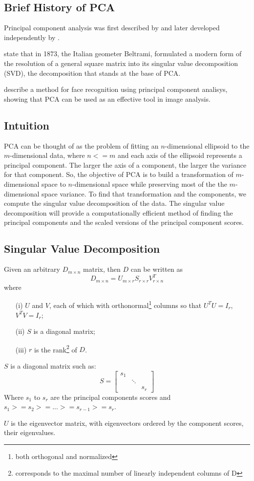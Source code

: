 \documentclass{article} %
\begin{document}
\subsection{Brief History of PCA}
Principal component analysis was first described by \citet{pearson1901principal} and later developed independently by \citet{hotelling1933analysis} \citep{jolliffe1986principal}.\par
\citet{preisendorfer1988principal} state that in 1873, the Italian geometer Beltrami, formulated a modern form of the resolution of a general square matrix into its singular value decomposition (SVD), the decomposition that stands at the base of PCA.\par
\citet{craw1992face} describe a method for face recognition using principal component analisys, showing that PCA can be used as an effective tool in image analysis.
\subsection{Intuition}
PCA can be thought of as the problem of fitting an $n$-dimensional ellipsoid to the $m$-dimensional data, where $n<=m$ and each axis of the ellipsoid represents a principal component. The larger the axis of a component, the larger the variance for that component. So, the objective of PCA is to build a transformation of $m$-dimensional space to $n$-dimensional space while preserving most of the the $m$-dimensional space variance. To find that transformation and the components, we compute the singular value decomposition of the data. The singular value decomposition will provide a computationally efficient method of finding the principal components and the scaled versions of the principal component scores.
\subsection{Singular Value Decomposition}
Given an arbitrary $D_{m\times n}$ matrix, then $D$ can be written as
\begin{equation} \label{eq:SVD}
D_{m\times n}=U_{m\times r}S_{r\times r}V_{r\times n}^T
\end{equation}
where
\begin{enumerate}
\item[(i)] $U$ and $V$, each of which with orthonormal\footnote{both orthogonal and normalized} columns so that $U^TU=I_{r}$, $V^TV=I_{r}$;
\item[(ii)] $S$ is a diagonal matrix;
\item[(iii)] $r$ is the rank\footnote{corresponds to the maximal number of linearly independent columns of D} of $D$.
\end{enumerate}
$S$ is a diagonal matrix such as:
\[
  S =
  \begin{bmatrix}
    s_{1} & & \\
    & \ddots & \\
    & & s_{r}
  \end{bmatrix}
\]
Where $s_{1}$ to $s_{r}$ are the principal components scores and $s_{1} >= s_{2} >= ... >= s_{r-1} >= s_{r}$.\par
$U$ is the eigenvector matrix, with eigenvectors ordered by the component scores, their eigenvalues.
\end{document}
